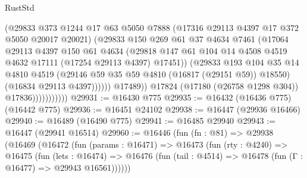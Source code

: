 \begin{lexlean}{RustStd}
\begin{coremodule}
                                  (@29833
                                    @373
                                    @1244
                                    @17
                                    @63
                                    @5050
                                    @7888
                                    (@17316 @29113 @4397 @17 @372 @5050 @20017 @20021)
                                    (@29833
                                      @150
                                      @269
                                      @61
                                      @37
                                      @4634
                                      @7461
                                      (@17064
                                        @29113
                                        @4397
                                        @150
                                        @61
                                        @4634
                                        (@29818
                                          @147
                                          @61
                                          @104
                                          @14
                                          @4508
                                          @4519
                                          @4632
                                          @17111
                                          (@17254 @29113 @4397)
                                          @17451))
                                      (@29833
                                        @193
                                        @104
                                        @35
                                        @14
                                        @4810
                                        @4519
                                        (@29146 @59 @35 @59 @4810 (@16817 (@29151 @59)) @18550)
                                        (@16834 @29113 @4397))))))
                              @17489))
                          @17824
                          (@17180 (@26758 @1298 @304))
                          @17836)))))))))))
@29931 := @16430 @775
@29935 := @16432 (@16436 @775) (@16442 @775)
@29936 := @16451 @24102
@29938 := @16447 (@29936 @16466)
@29940 := @16489 (@16490 @775)
@29941 := @16485 @29940
@29943 := @16447 (@29941 @16514)
@29960 := @16446
    (fun (fn : @81) =>
    @29938
      (@16469
        (@16472
          (fun (params : @16471) =>
          @16473
            (fun (rty : @4240) =>
            @16475
              (fun (lets : @16474) =>
              @16476 (fun (tail : @4514) => @16478 (fun (Γ : @16477) => @29943 @16561))))))

\end{coremodule}
\end{lexlean}
